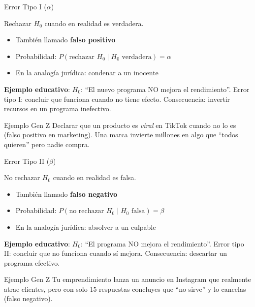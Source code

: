 \documentclass[aspectratio=169, 11pt]{beamer}
\begin{document}
\begin{frame}{Error Tipo I ($\alpha$)}
\begin{definition}
Rechazar $H_0$ cuando en realidad es \alert{verdadera}.
\end{definition}

\vspace{0.2cm}
\begin{itemize}
  \item También llamado \textbf{falso positivo}
  \item Probabilidad: $P(\text{rechazar } H_0 \mid H_0 \text{ verdadera}) = \alpha$
  \item En la analogía jurídica: condenar a un inocente
\end{itemize}

\vspace{0.2cm}
\textbf{Ejemplo educativo}: $H_0$: ``El nuevo programa NO mejora el rendimiento''. Error tipo I: concluir que funciona cuando no tiene efecto. Consecuencia: invertir recursos en un programa inefectivo.

\begin{exampleblock}{Ejemplo Gen Z}
Declarar que un producto es \textit{viral} en TikTok cuando no lo es (falso positivo en marketing). Una marca invierte millones en algo que ``todos quieren'' pero nadie compra.
\end{exampleblock}
\end{frame}

\begin{frame}{Error Tipo II ($\beta$)}
\begin{definition}
\alert{No rechazar} $H_0$ cuando en realidad es \alert{falsa}.
\end{definition}

\vspace{0.2cm}
\begin{itemize}
  \item También llamado \textbf{falso negativo}
  \item Probabilidad: $P(\text{no rechazar } H_0 \mid H_0 \text{ falsa}) = \beta$
  \item En la analogía jurídica: absolver a un culpable
\end{itemize}

\vspace{0.2cm}
\textbf{Ejemplo educativo}: $H_0$: ``El programa NO mejora el rendimiento''. Error tipo II: concluir que no funciona cuando s\'i mejora. Consecuencia: descartar un programa efectivo.

\begin{exampleblock}{Ejemplo Gen Z}
Tu emprendimiento lanza un anuncio en Instagram que realmente atrae clientes, pero con solo 15 respuestas concluyes que ``no sirve'' y lo cancelas (falso negativo).
\end{exampleblock}
\end{frame}
\end{document}
